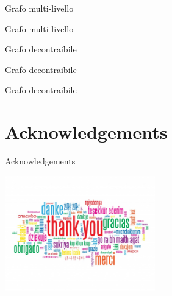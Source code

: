 \documentclass[xcolor=x11names,compress]{beamer}
\begin{document}
\begin{frame}[t]{Grafo multi-livello}
    \vspace{-0.5cm}
    
\end{frame}

\begin{frame}[t]{Grafo multi-livello}
    \vspace{-0.5cm}
    
    
\end{frame}

\begin{frame}[t]{Grafo decontraibile}
    \vspace{-0.5cm}
    
\end{frame}

\begin{frame}[t]{Grafo decontraibile}
    \vspace{-0.5cm}
    
    
\end{frame}

\begin{frame}[t]{Grafo decontraibile}
    \vspace{-0.5cm}
    
    
\end{frame}

\section*{Acknowledgements}
\begin{frame}{Acknowledgements}
\begin{center}
\includegraphics[width=6.5cm]{./immagini/thanks}
\end{center}
\end{frame}
\end{document}
